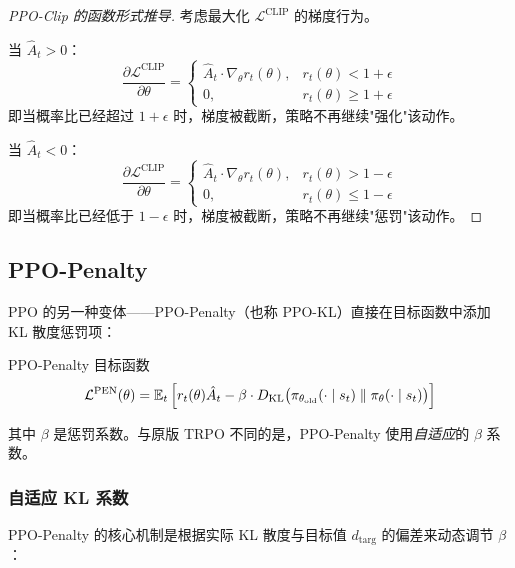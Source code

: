 \begin{proof}[PPO-Clip 的函数形式推导]
考虑最大化 $\mathcal{L}^{\text{CLIP}}$ 的梯度行为。

当 $\hat{A}_t > 0$：
\[
\frac{\partial \mathcal{L}^{\text{CLIP}}}{\partial \theta} =
\begin{cases}
\hat{A}_t \cdot \nabla_\theta r_t(\theta), & r_t(\theta) < 1+\epsilon \\
0, & r_t(\theta) \ge 1+\epsilon
\end{cases}
\]
即当概率比已经超过 $1+\epsilon$ 时，梯度被截断，策略不再继续"强化"该动作。

当 $\hat{A}_t < 0$：
\[
\frac{\partial \mathcal{L}^{\text{CLIP}}}{\partial \theta} =
\begin{cases}
\hat{A}_t \cdot \nabla_\theta r_t(\theta), & r_t(\theta) > 1-\epsilon \\
0, & r_t(\theta) \le 1-\epsilon
\end{cases}
\]
即当概率比已经低于 $1-\epsilon$ 时，梯度被截断，策略不再继续"惩罚"该动作。
\end{proof}

\subsection{PPO-Penalty}

PPO 的另一种变体——PPO-Penalty（也称 PPO-KL）直接在目标函数中添加 KL 散度惩罚项：

\begin{mydefinition}{PPO-Penalty 目标函数}
\[
\mathcal{L}^{\text{PEN}}(\theta) = \mathbb{E}_t \left[
    r_t(\theta) \hat{A}_t - \beta \cdot D_{\text{KL}}\big( \pi_{\theta_{\text{old}}}(\cdot \mid s_t) \;\|\; \pi_\theta(\cdot \mid s_t) \big)
\right]
\]
\end{mydefinition}

其中 $\beta$ 是惩罚系数。与原版 TRPO 不同的是，PPO-Penalty 使用\emph{自适应}的 $\beta$ 系数。

\subsubsection{自适应 KL 系数}

PPO-Penalty 的核心机制是根据实际 KL 散度与目标值 $d_{\text{targ}}$ 的偏差来动态调节 $\beta$：

